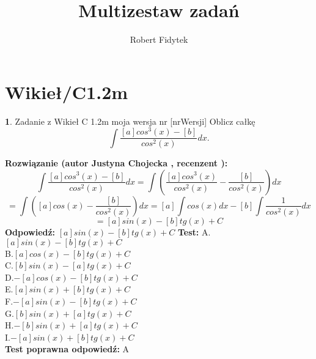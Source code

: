 \documentclass[12pt, a4paper]{article}
\title{Multizestaw zadań}
\author{Robert Fidytek}
\date{}
\theoremstyle{definition} %
\newtheorem{zad}{}
\newcommand{\kategoria}[1]{\section{#1}} %
\newcommand{\zadStart}[1]{\begin{zad}#1\newline} %
\newcommand{\zadStop}{\end{zad}}   %
\newcommand{\rozwStart}[2]{\noindent \textbf{Rozwiązanie (autor #1 , recenzent #2): }\newline} %
\newcommand{\rozwStop}{\newline}                                            %
\newcommand{\odpStart}{\noindent \textbf{Odpowiedź:}\newline}    %
\newcommand{\odpStop}{\newline}                                             %
\newcommand{\testStart}{\noindent \textbf{Test:}\newline} %
\newcommand{\testStop}{\newline} %
\newcommand{\kluczStart}{\noindent \textbf{Test poprawna odpowiedź:}\newline} %
\newcommand{\kluczStop}{\newline} %
\begin{document}
\maketitle
\kategoria{Wikieł/C1.2m}
\zadStart{Zadanie z Wikieł C 1.2m moja wersja nr [nrWersji]}
Oblicz całkę $$\int \frac{[a]cos^{3}(x)-[b]}{cos^{2}(x)} dx.$$
\zadStop
\rozwStart{Justyna Chojecka}{}
$$\int \frac{[a]cos^{3}(x)-[b]}{cos^{2}(x)} dx=\int\left(\frac{[a]cos^{3}(x)}{cos^{2}(x)}-\frac{[b]}{cos^{2}(x)}\right)dx$$$$=\int\left([a]cos(x)-\frac{[b]}{cos^{2}(x)}\right)dx=[a]\int cos(x)dx-[b]\int \frac{1}{cos^{2}(x)}dx$$$$=[a]sin(x)-[b]tg(x)+C$$
\rozwStop
\odpStart
$[a]sin(x)-[b]tg(x)+C$
\odpStop
\testStart
A.$[a]sin(x)-[b]tg(x)+C$\\
B.$[a]cos(x)-[b]tg(x)+C$\\
C.$[b]sin(x)-[a]tg(x)+C$\\
D.$-[a]cos(x)-[b]tg(x)+C$\\
E.$[a]sin(x)+[b]tg(x)+C$\\
F.$-[a]sin(x)-[b]tg(x)+C$\\
G.$[b]sin(x)+[a]tg(x)+C$\\
H.$-[b]sin(x)+[a]tg(x)+C$\\
I.$-[a]sin(x)+[b]tg(x)+C$\\
\testStop
\kluczStart
A
\kluczStop
\end{document}
